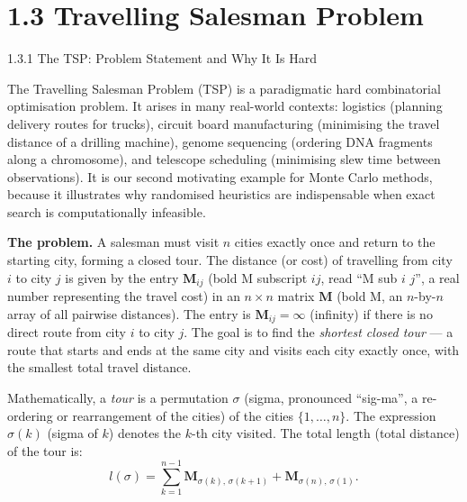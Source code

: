 \documentclass[aspectratio=169,10pt]{beamer}
\begin{document}
\section{1.3 Travelling Salesman Problem}

\begin{frame}[allowframebreaks]{1.3.1 The TSP: Problem Statement and Why It Is Hard}

  The Travelling Salesman Problem (TSP) is a paradigmatic hard combinatorial
  optimisation problem.  It arises in many real-world contexts: logistics
  (planning delivery routes for trucks), circuit board manufacturing (minimising
  the travel distance of a drilling machine), genome sequencing (ordering DNA
  fragments along a chromosome), and telescope scheduling (minimising slew time
  between observations).  It is our second motivating example for Monte Carlo
  methods, because it illustrates why randomised heuristics are indispensable
  when exact search is computationally infeasible.

  \textbf{The problem.}  A salesman must visit $n$ cities exactly once and
  return to the starting city, forming a closed tour.  The distance (or cost)
  of travelling from city $i$ to city $j$ is given by the entry $\mathbf{M}_{ij}$
  (bold M subscript $ij$, read ``M sub $i$ $j$'', a real number representing
  the travel cost) in an $n \times n$ matrix $\mathbf{M}$ (bold M, an $n$-by-$n$
  array of all pairwise distances).  The entry is $\mathbf{M}_{ij} = \infty$
  (infinity) if there is no direct route from city $i$ to city $j$.  The goal
  is to find the \emph{shortest closed tour} --- a route that starts and ends at
  the same city and visits each city exactly once, with the smallest total travel
  distance.

  Mathematically, a \emph{tour} is a permutation $\sigma$ (sigma, pronounced
  ``sig-ma'', a re-ordering or rearrangement of the cities) of the cities
  $\{1, \ldots, n\}$.  The expression $\sigma(k)$ (sigma of $k$) denotes the
  $k$-th city visited.  The total length (total distance) of the tour is:
  \[
    l(\sigma) = \sum_{k=1}^{n-1} \mathbf{M}_{\sigma(k),\,\sigma(k+1)}
    + \mathbf{M}_{\sigma(n),\,\sigma(1)}.
  \]


\end{frame}
\end{document}
